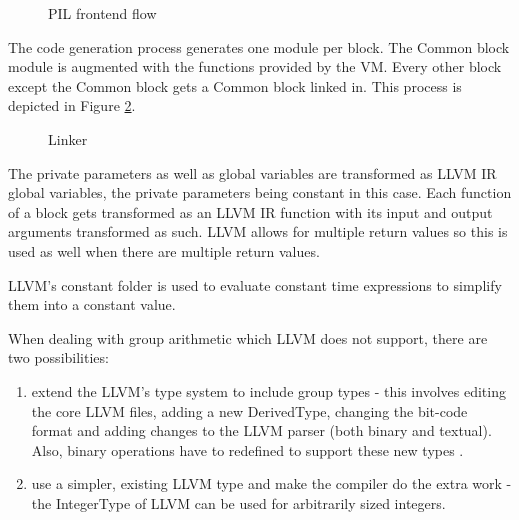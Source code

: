\begin{figure}[hbt!]
  \centering
  \caption{PIL frontend flow}
  \label{fig:pil_frontend_flow}
\end{figure}

\filbreak

The code generation process generates one module per block. The Common
block module is augmented with the functions provided by the VM.
Every other block except the Common block gets a Common block linked
in. This process is depicted in Figure \ref{fig:linker}.

\begin{figure}[hbt!]
  \centering
  \caption{Linker}
  \label{fig:linker}
\end{figure}

The private parameters as well as global variables are transformed as
LLVM IR global variables, the private parameters being constant in
this case. Each function of a block gets transformed as an LLVM IR
function with its input and output arguments transformed as such. LLVM
allows for multiple return values so this is used as well when there
are multiple return values.

LLVM's constant folder is used to evaluate constant time expressions
to simplify them into a constant value.

When dealing with group arithmetic which LLVM does not support, there are
two possibilities:
\begin{enumerate}
\item extend the LLVM's type system to include group types - this
  involves editing the core LLVM files, adding a new DerivedType,
  changing the bit-code format and adding changes to the LLVM parser
  (both binary and textual). Also, binary operations have to redefined
  to support these new types \cite{extending_llvm}.
\item use a simpler, existing LLVM type and make the compiler do the
  extra work - the IntegerType of LLVM can be used for arbitrarily sized
  integers.
\end{enumerate}

